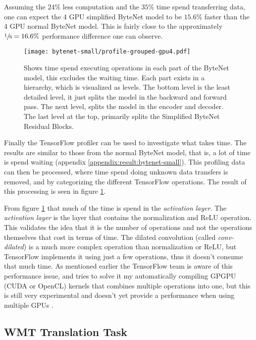 Assuming the $24\%$ less computation and the $35\%$ time spend transferring data, one can expect the 4 GPU simplified ByteNet model to be $15.6\%$ faster than the 4 GPU normal ByteNet model. This is fairly close to the approximately $\sfrac{1}{6} = 16.6\%$ performance difference one can observe.

\begin{figure}[h]
    \centering
    \texttt{[image: bytenet-small/profile-grouped-gpu4.pdf]}
    \caption{Shows time spend executing operations in each part of the ByteNet model, this excludes the waiting time. Each part exists in a hierarchy, which is visualized as levels. The bottom level is the least detailed level, it just splits the model in the backward and forward pass. The next level, splits the model in the encoder and decoder. The last level at the top, primarily splits the Simplified ByteNet Residual Blocks.}
    \label{fig:result:simple-bytenet:profile-raw}
\end{figure}

Finally the TensorFlow profiler can be used to investigate what takes time. The results are similar to those from the normal ByteNet model, that is, a lot of time is spend waiting (appendix \ref{appendix:result:bytenet-small}). This profiling data can then be processed, where time spend doing unknown data transfers is removed, and by categorizing the different TensorFlow operations. The result of this processing is seen in figure     \ref{fig:result:simple-bytenet:profile-raw}.

From figure \ref{fig:result:simple-bytenet:profile-raw} that much of the time is spend in the \textit{activation layer}. The \textit{activation layer} is the layer that contains the normalization and ReLU operation. This validates the idea that it is the number of operations and not the operations themselves that cost in terms of time. The dilated convolution (called \textit{conv-dilated}) is a much more complex operation than normalization or ReLU, but TensorFlow implements it using just a few operations, thus it doesn't consume that much time. As mentioned earlier the TensorFlow team is aware of this performance issue, and tries to solve it my automatically compiling GPGPU (CUDA or OpenCL) kernels that combines multiple operations into one, but this is still very experimental and doesn't yet provide a performance when using multiple GPUs \cite{citation-needed}.

\clearpage
\subsection{WMT Translation Task}

